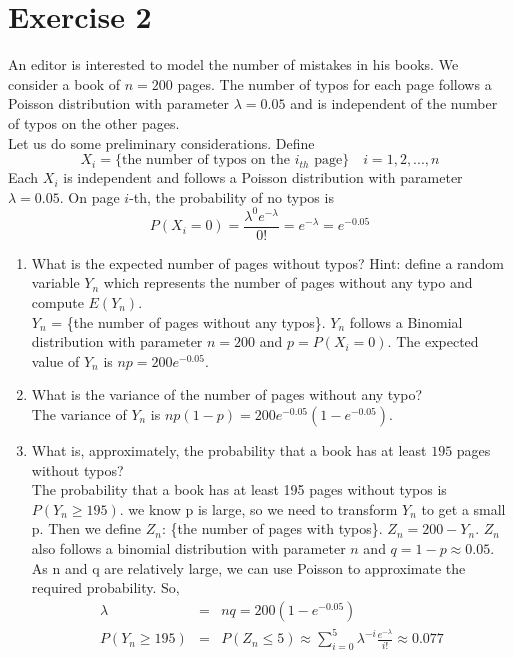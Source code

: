 \documentclass[12pt,thmsa]{article}
\begin{document}
\section*{Exercise 2}

An editor is interested to model the number of mistakes in his books.
We consider a book of $n=200$ pages. The number of typos for each page follows a Poisson distribution
with parameter $\lambda=0.05$ and is independent of the number of typos on the other pages.\\

\noindent Let us do some preliminary considerations. Define 
$$
X_i = \{\text{the number of typos on the $i_{th} $ page}\} \quad i = 1, 2, ..., n 
$$
Each $X_i$ is independent and follows a Poisson distribution with parameter $\lambda = 0.05$. On page $i$-th, the probability of no typos is 
$$P(X_i= 0) = \frac{\lambda^0e^{-\lambda}}{0!} = e^{-\lambda} =e^{-0.05}
$$
\begin{enumerate}
  \item What is the expected number of pages without typos? \newline
 Hint: define a random variable $Y_n$ which represents the number of pages without any typo and compute $E(Y_n)$.\\

$Y_n$ = \{the number of pages without any typos\}. $Y_n$ follows a Binomial distribution with parameter $n=200$ and $p = P(X_i=0)$. The expected value of $Y_n$ is $np = 200e^{-0.05} $.

 
  \item What is the variance of the number of pages without any typo?\\

The variance of $Y_n$ is $np(1-p) = 200e^{-0.05}(1-e^{-0.05}) $.
  \item What is, approximately, the probability that a book has at least $195$ pages without typos? \\

The probability that a book has at least 195 pages without typos is $ P(Y_n \geq 195) $. 
we know p is large, so we need to transform $Y_n$ to get a small p. Then we define $Z_n$: \{the number of pages with typos\}.
$Z_n = 200-Y_n$. $Z_n$ also follows a binomial distribution with parameter $n$ and $q=1-p \approx 0.05$.
As n and q are relatively large, we can use Poisson to approximate the required probability. So,  
\begin{eqnarray*}
\lambda &=& nq = 200(1-e^{-0.05}) \\
 P(Y_n \geq 195) &=& P(Z_n \leq 5) \approx \sum_{i=0}^{5} \lambda^{-i}\frac{e^{-\lambda}}{i!} \approx 0.077
\end{eqnarray*}
\end{enumerate}
\end{document}
